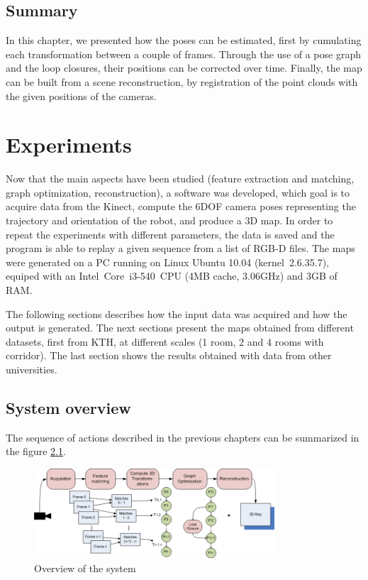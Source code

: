 \section{Summary}

In this chapter, we presented how the poses can be estimated, first by cumulating each transformation between a couple of frames. Through the use of a pose graph and the loop closures, their positions can be corrected over time. Finally, the map can be built from a scene reconstruction, by registration of the point clouds with the given positions of the cameras.

\chapter{Experiments}
\label{chap:experiments}

Now that the main aspects have been studied (feature extraction and matching, graph optimization, reconstruction), a software was developed, which goal is to acquire data from the Kinect, compute the 6DOF camera poses representing the trajectory and orientation of the robot, and produce a 3D map. In order to repeat the experiments with different parameters, the data is saved and the program is able to replay a given sequence from a list of RGB-D files. The maps were generated on a PC running on Linux Ubuntu 10.04 (kernel~2.6.35.7), equiped with an Intel~Core\texttrademark{}~i3-540~CPU (4MB cache, 3.06GHz) and 3GB of RAM.

The following sections describes how the input data was acquired and how the output is generated. The next sections present the maps obtained from different datasets, first from KTH, at different scales (1 room, 2 and 4 rooms with corridor). The last section shows the results obtained with data from other universities.

\section{System overview}

The sequence of actions described in the previous chapters can be summarized in the figure \ref{fig:system_overview}.

\begin{figure}[h!]
\begin{center}
\includegraphics[width=0.8\textwidth]{figures/overview}
\caption{Overview of the system}
\label{fig:system_overview}
\end{center}
\end{figure}


